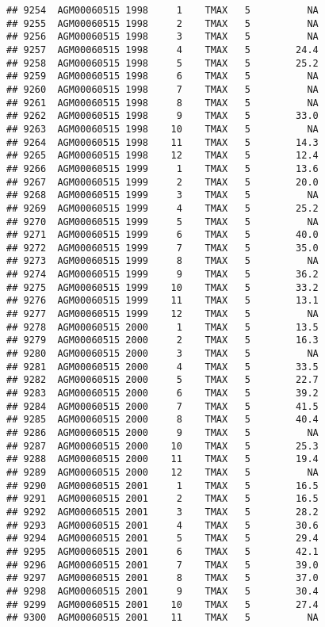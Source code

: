 \documentclass{article}\usepackage[]{graphicx}\usepackage[]{color}
\makeatletter
\newenvironment{kframe}{%
 \def\at@end@of@kframe{}%
 \ifinner\ifhmode%
  \def\at@end@of@kframe{\end{minipage}}%
  \begin{minipage}{\columnwidth}%
 \fi\fi%
 \def\FrameCommand##1{\hskip\@totalleftmargin \hskip-\fboxsep
 \colorbox{shadecolor}{##1}\hskip-\fboxsep
     \hskip-\linewidth \hskip-\@totalleftmargin \hskip\columnwidth}%
 \MakeFramed {\advance\hsize-\width
   \@totalleftmargin\z@ \linewidth\hsize
   \@setminipage}}%
 {\par\unskip\endMakeFramed%
 \at@end@of@kframe}
\newenvironment{knitrout}{}{} %
\makeatother
\begin{document}
\begin{knitrout}
\begin{kframe}
\begin{verbatim}
## 9254  AGM00060515 1998     1    TMAX   5          NA
## 9255  AGM00060515 1998     2    TMAX   5          NA
## 9256  AGM00060515 1998     3    TMAX   5          NA
## 9257  AGM00060515 1998     4    TMAX   5        24.4
## 9258  AGM00060515 1998     5    TMAX   5        25.2
## 9259  AGM00060515 1998     6    TMAX   5          NA
## 9260  AGM00060515 1998     7    TMAX   5          NA
## 9261  AGM00060515 1998     8    TMAX   5          NA
## 9262  AGM00060515 1998     9    TMAX   5        33.0
## 9263  AGM00060515 1998    10    TMAX   5          NA
## 9264  AGM00060515 1998    11    TMAX   5        14.3
## 9265  AGM00060515 1998    12    TMAX   5        12.4
## 9266  AGM00060515 1999     1    TMAX   5        13.6
## 9267  AGM00060515 1999     2    TMAX   5        20.0
## 9268  AGM00060515 1999     3    TMAX   5          NA
## 9269  AGM00060515 1999     4    TMAX   5        25.2
## 9270  AGM00060515 1999     5    TMAX   5          NA
## 9271  AGM00060515 1999     6    TMAX   5        40.0
## 9272  AGM00060515 1999     7    TMAX   5        35.0
## 9273  AGM00060515 1999     8    TMAX   5          NA
## 9274  AGM00060515 1999     9    TMAX   5        36.2
## 9275  AGM00060515 1999    10    TMAX   5        33.2
## 9276  AGM00060515 1999    11    TMAX   5        13.1
## 9277  AGM00060515 1999    12    TMAX   5          NA
## 9278  AGM00060515 2000     1    TMAX   5        13.5
## 9279  AGM00060515 2000     2    TMAX   5        16.3
## 9280  AGM00060515 2000     3    TMAX   5          NA
## 9281  AGM00060515 2000     4    TMAX   5        33.5
## 9282  AGM00060515 2000     5    TMAX   5        22.7
## 9283  AGM00060515 2000     6    TMAX   5        39.2
## 9284  AGM00060515 2000     7    TMAX   5        41.5
## 9285  AGM00060515 2000     8    TMAX   5        40.4
## 9286  AGM00060515 2000     9    TMAX   5          NA
## 9287  AGM00060515 2000    10    TMAX   5        25.3
## 9288  AGM00060515 2000    11    TMAX   5        19.4
## 9289  AGM00060515 2000    12    TMAX   5          NA
## 9290  AGM00060515 2001     1    TMAX   5        16.5
## 9291  AGM00060515 2001     2    TMAX   5        16.5
## 9292  AGM00060515 2001     3    TMAX   5        28.2
## 9293  AGM00060515 2001     4    TMAX   5        30.6
## 9294  AGM00060515 2001     5    TMAX   5        29.4
## 9295  AGM00060515 2001     6    TMAX   5        42.1
## 9296  AGM00060515 2001     7    TMAX   5        39.0
## 9297  AGM00060515 2001     8    TMAX   5        37.0
## 9298  AGM00060515 2001     9    TMAX   5        30.4
## 9299  AGM00060515 2001    10    TMAX   5        27.4
## 9300  AGM00060515 2001    11    TMAX   5          NA

\end{verbatim}
\end{kframe}
\end{knitrout}
\end{document}
